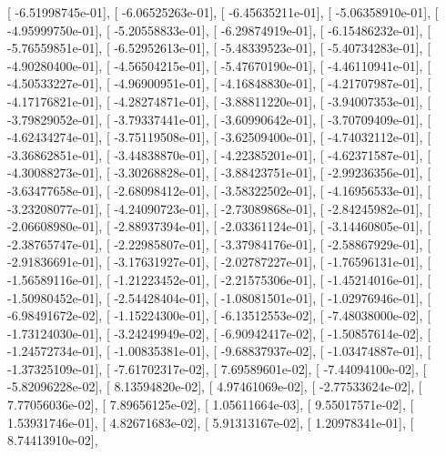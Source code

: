 \documentclass{article}
\begin{document}
       [ -6.51998745e-01],
       [ -6.06525263e-01],
       [ -6.45635211e-01],
       [ -5.06358910e-01],
       [ -4.95999750e-01],
       [ -5.20558833e-01],
       [ -6.29874919e-01],
       [ -6.15486232e-01],
       [ -5.76559851e-01],
       [ -6.52952613e-01],
       [ -5.48339523e-01],
       [ -5.40734283e-01],
       [ -4.90280400e-01],
       [ -4.56504215e-01],
       [ -5.47670190e-01],
       [ -4.46110941e-01],
       [ -4.50533227e-01],
       [ -4.96900951e-01],
       [ -4.16848830e-01],
       [ -4.21707987e-01],
       [ -4.17176821e-01],
       [ -4.28274871e-01],
       [ -3.88811220e-01],
       [ -3.94007353e-01],
       [ -3.79829052e-01],
       [ -3.79337441e-01],
       [ -3.60990642e-01],
       [ -3.70709409e-01],
       [ -4.62434274e-01],
       [ -3.75119508e-01],
       [ -3.62509400e-01],
       [ -4.74032112e-01],
       [ -3.36862851e-01],
       [ -3.44838870e-01],
       [ -4.22385201e-01],
       [ -4.62371587e-01],
       [ -4.30088273e-01],
       [ -3.30268828e-01],
       [ -3.88423751e-01],
       [ -2.99236356e-01],
       [ -3.63477658e-01],
       [ -2.68098412e-01],
       [ -3.58322502e-01],
       [ -4.16956533e-01],
       [ -3.23208077e-01],
       [ -4.24090723e-01],
       [ -2.73089868e-01],
       [ -2.84245982e-01],
       [ -2.06608980e-01],
       [ -2.88937394e-01],
       [ -2.03361124e-01],
       [ -3.14460805e-01],
       [ -2.38765747e-01],
       [ -2.22985807e-01],
       [ -3.37984176e-01],
       [ -2.58867929e-01],
       [ -2.91836691e-01],
       [ -3.17631927e-01],
       [ -2.02787227e-01],
       [ -1.76596131e-01],
       [ -1.56589116e-01],
       [ -1.21223452e-01],
       [ -2.21575306e-01],
       [ -1.45214016e-01],
       [ -1.50980452e-01],
       [ -2.54428404e-01],
       [ -1.08081501e-01],
       [ -1.02976946e-01],
       [ -6.98491672e-02],
       [ -1.15224300e-01],
       [ -6.13512553e-02],
       [ -7.48038000e-02],
       [ -1.73124030e-01],
       [ -3.24249949e-02],
       [ -6.90942417e-02],
       [ -1.50857614e-02],
       [ -1.24572734e-01],
       [ -1.00835381e-01],
       [ -9.68837937e-02],
       [ -1.03474887e-01],
       [ -1.37325109e-01],
       [ -7.61702317e-02],
       [  7.69589601e-02],
       [ -7.44094100e-02],
       [ -5.82096228e-02],
       [  8.13594820e-02],
       [  4.97461069e-02],
       [ -2.77533624e-02],
       [  7.77056036e-02],
       [  7.89656125e-02],
       [  1.05611664e-03],
       [  9.55017571e-02],
       [  1.53931746e-01],
       [  4.82671683e-02],
       [  5.91313167e-02],
       [  1.20978341e-01],
       [  8.74413910e-02],
\end{document}
